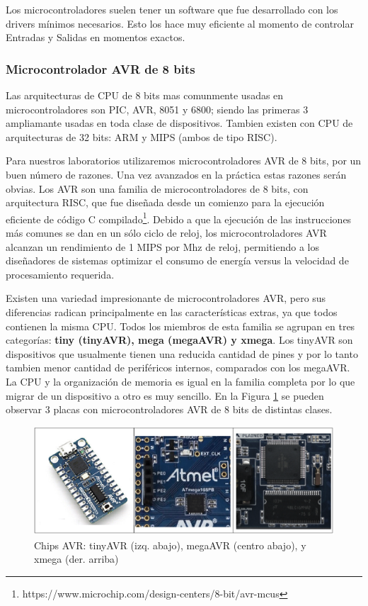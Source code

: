 \documentclass[output=paper, 
colorlinks,
citecolor=brown,
newtxmath
]{langscibook}
\begin{document}
Los microcontroladores suelen tener un software que fue 
desarrollado con los drivers mínimos necesarios. Esto los hace
muy eficiente al momento de controlar Entradas y Salidas
en momentos exactos. 

\subsubsection*{Microcontrolador AVR de 8 bits}

Las arquitecturas de CPU de 8 bits mas comunmente usadas en microcontroladores
son PIC, AVR, 8051 y 6800; siendo las primeras 3 ampliamante usadas
en toda clase de dispositivos. Tambien existen con CPU de
arquitecturas de 32 bits: ARM y MIPS (ambos de tipo RISC).

Para nuestros laboratorios utilizaremos microcontroladores AVR de 8 bits,
por un buen número de razones. Una vez avanzados en la práctica
estas razones serán obvias. Los AVR son una familia de microcontroladores de 8 bits, con arquitectura
RISC, que fue diseñada desde un comienzo 
para la ejecución eficiente de código C compilado\footnote{https://www.microchip.com/design-centers/8-bit/avr-mcus}. Debido a que
la ejecución de las instrucciones más comunes se dan en un sólo
ciclo de reloj, los microcontroladores AVR alcanzan un rendimiento
de 1 MIPS por Mhz de reloj, permitiendo a los diseñadores de
sistemas optimizar el consumo de energía versus la velocidad
de procesamiento requerida.

Existen una variedad impresionante de microcontroladores AVR,
pero sus diferencias radican principalmente en las características extras, 
ya que todos contienen la misma CPU. Todos los miembros de esta 
familia se agrupan en tres 
categorías: \textbf{tiny (tinyAVR), mega (megaAVR) y xmega}. 
Los tinyAVR son dispositivos que usualmente tienen
una reducida cantidad de pines y por lo tanto tambien menor
cantidad de periféricos internos, comparados con los megaAVR.
La CPU y la organización de memoria es igual en la familia
completa por lo que migrar de un dispositivo a otro es muy sencillo.
En la Figura \ref{fig:boardsavr} se pueden observar 3 placas con 
microcontroladores AVR de 8 bits de distintas clases.

\begin{figure}
\includegraphics[scale=0.3]{images/boardsavr.png}
\caption{Chips AVR: tinyAVR (izq. abajo), megaAVR (centro abajo), y xmega (der. arriba)}
\label{fig:boardsavr}
\end{figure}
\end{document}
